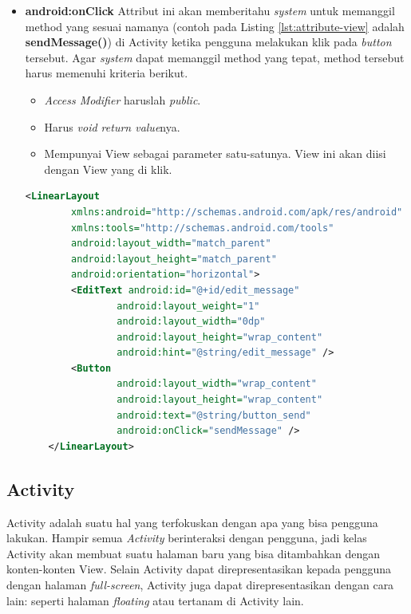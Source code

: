 \begin{itemize}
	\item \textbf{android:onClick}
	Attribut ini akan memberitahu \textit{system} untuk memanggil method yang sesuai namanya (contoh pada Listing \ref{lst:attribute-view} adalah \textbf{sendMessage()}) di Activity ketika pengguna melakukan klik pada \textit{button} tersebut. Agar \textit{system} dapat memanggil method yang tepat, method tersebut harus memenuhi kriteria berikut.
	\begin{itemize}
		\item \textit{Access Modifier} haruslah \textit{public}.
		\item Harus \textit{void return value}nya.
		\item Mempunyai View sebagai parameter satu-satunya. View ini akan diisi dengan View yang di klik.
	\end{itemize}
\begin{lstlisting}[caption={Contoh kode file XML pada folder layout},label={lst:attribute-view},language=xml]
	<LinearLayout
		xmlns:android="http://schemas.android.com/apk/res/android"
		xmlns:tools="http://schemas.android.com/tools"
		android:layout_width="match_parent"
		android:layout_height="match_parent"
		android:orientation="horizontal">
		<EditText android:id="@+id/edit_message"
				android:layout_weight="1"
				android:layout_width="0dp"
				android:layout_height="wrap_content"
				android:hint="@string/edit_message" />
		<Button
				android:layout_width="wrap_content"
				android:layout_height="wrap_content"
				android:text="@string/button_send"
				android:onClick="sendMessage" />
	</LinearLayout>
\end{lstlisting}
\end{itemize}


\subsection{Activity}
\label{sec:activity}
\cite{android_developers}
Activity adalah suatu hal yang terfokuskan dengan apa yang bisa pengguna lakukan. Hampir semua \textit{Activity} berinteraksi dengan pengguna, jadi kelas Activity akan membuat suatu halaman baru yang bisa ditambahkan dengan konten-konten View. Selain Activity dapat direpresentasikan kepada pengguna dengan halaman \textit{full-screen}, Activity juga dapat direpresentasikan dengan cara lain: seperti halaman \textit{floating} atau tertanam di Activity lain.

